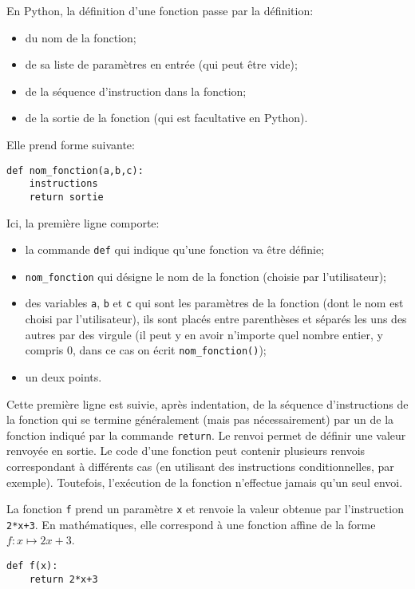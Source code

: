 En Python, la définition d'une fonction passe par la définition:
\begin{itemize}
	\item du nom de la fonction;
	\item de sa liste de paramètres en entrée (qui peut être vide);
	\item de la séquence d'instruction dans la fonction;
	\item de la sortie de la fonction (qui est facultative en Python). 
\end{itemize}
Elle prend forme suivante:
	\begin{center}
	\begin{varwidth}[t]{.5\textwidth}
		\begin{lstlisting}[language=iPython,linewidth = 7cm]
def nom_fonction(a,b,c):
    instructions
    return sortie
\end{lstlisting}\end{varwidth}\end{center}
Ici, la première ligne comporte:
\begin{itemize}
	\item la commande \texttt{def} qui indique qu'une fonction va être définie;
	\item \texttt{nom\_fonction} qui désigne le nom de la fonction (choisie par l'utilisateur);
	\item des variables \texttt{a}, \texttt{b} et \texttt{c} qui sont les paramètres de la fonction (dont le nom est choisi par l'utilisateur), ils sont placés entre parenthèses et séparés les uns des autres par des virgule (il peut y en avoir n'importe quel nombre entier, y compris 0, dans ce cas on écrit \texttt{nom\_fonction()});
	\item un deux points.
\end{itemize}
Cette première ligne est suivie, après indentation, de la séquence  d'instructions de la fonction qui se termine généralement (mais pas nécessairement) par un  de la fonction indiqué par la commande \texttt{return}. Le renvoi permet de définir une valeur renvoyée en sortie. Le code d'une fonction peut contenir plusieurs renvois correspondant à différents cas (en utilisant des instructions conditionnelles, par exemple). Toutefois, l'exécution de la fonction n'effectue jamais qu'un seul envoi.

\begin{example}
	La fonction \texttt{f} prend un paramètre \texttt{x} et renvoie la valeur obtenue par l'instruction \texttt{2*x+3}. En mathématiques, elle correspond à une fonction affine de la forme $f:x\mapsto 2x+3$.
	\begin{center}
	\begin{varwidth}[t]{.5\textwidth}
		\begin{lstlisting}[language=iPython,linewidth = 5cm]
def f(x):
    return 2*x+3
\end{lstlisting}\end{varwidth}\end{center}
\end{example}

